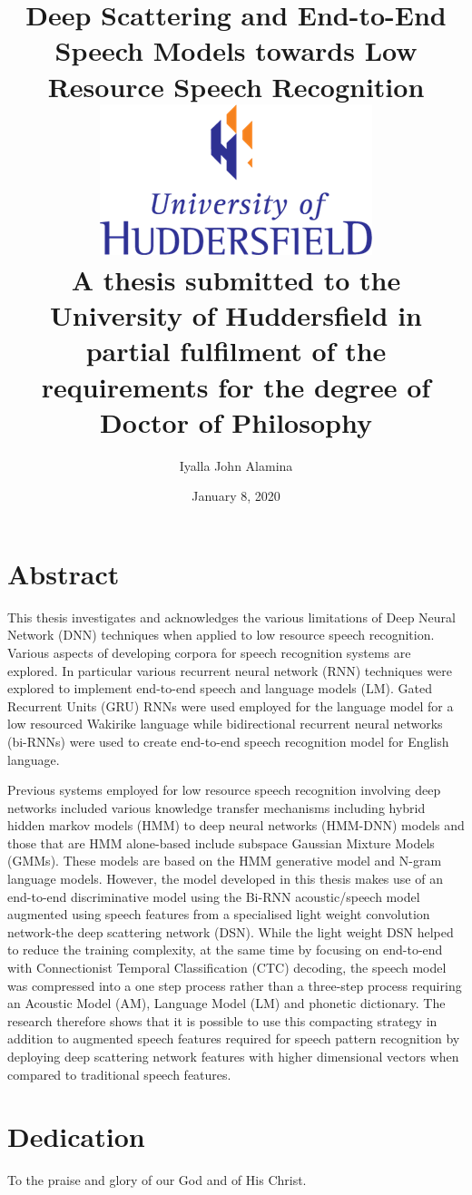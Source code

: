 \documentclass[12pt,twoside]{report}
\title{
    {Deep Scattering and End-to-End Speech Models towards Low Resource Speech Recognition}\\
    {\includegraphics{university.png}\\
A thesis submitted to the University of Huddersfield in partial fulfilment of the requirements for the degree of Doctor of Philosophy}
}
\author{Iyalla John Alamina}
\date{January 8, 2020}
\begin{document}
\maketitle
{}

\chapter*{Abstract}
This thesis investigates and acknowledges the various limitations of Deep Neural Network (DNN) techniques when applied to low resource speech recognition.   Various aspects of developing corpora for speech recognition systems are explored.  In particular various recurrent neural network (RNN) techniques were explored to implement end-to-end speech and language models (LM). Gated Recurrent Units (GRU) RNNs were used employed for the language model for a low resourced Wakirike language while bidirectional recurrent neural networks (bi-RNNs) were used to create end-to-end speech recognition model for English language.

Previous systems employed for low resource speech recognition involving deep networks included various knowledge transfer mechanisms including hybrid hidden markov models (HMM) to deep neural networks (HMM-DNN) models and those that are HMM alone-based include subspace Gaussian Mixture Models (GMMs).   These models are based on the HMM generative model and N-gram language models.  However, the model developed in this thesis makes use of an end-to-end discriminative model using the Bi-RNN acoustic/speech model augmented using speech features from a specialised light weight convolution network-the deep scattering network (DSN).  While the light weight DSN helped to reduce the training complexity, at the same time by focusing on end-to-end with Connectionist Temporal Classification (CTC) decoding, the speech model was compressed into a one step process rather than a three-step process requiring an Acoustic Model (AM), Language Model (LM) and phonetic dictionary. The research therefore shows that it is possible to use this compacting strategy in addition to augmented speech features required for speech pattern recognition by deploying deep scattering network features with  higher dimensional vectors when compared to traditional speech features. 

\chapter*{Dedication}
To the praise and glory of our God and of His Christ.
\end{document}
